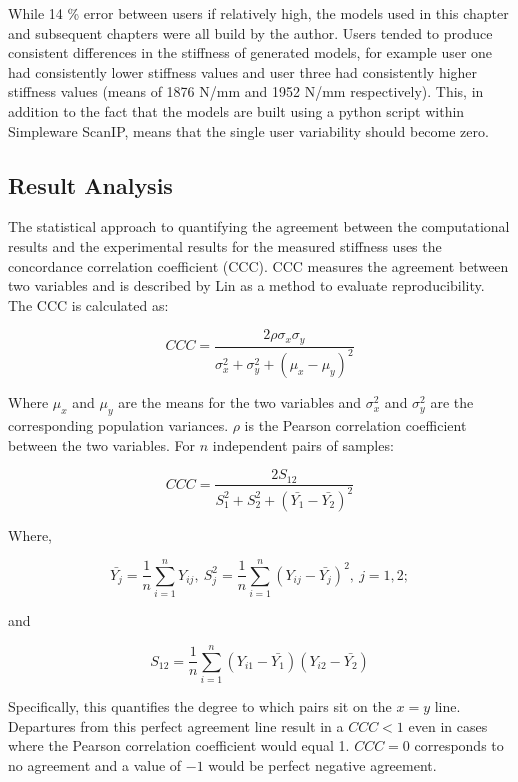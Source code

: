 While 14 \% error between users if relatively high, the models used in this
chapter and subsequent chapters were all build by the author. Users tended to
produce consistent differences in the stiffness of generated models, for
example user one had consistently lower stiffness values and user three had
consistently higher stiffness values (means of 1876 N/mm and 1952 N/mm
respectively). This, in addition to the fact that the models are built using a
python script within Simpleware ScanIP, means that the single user variability
should become zero.

\subsection{Result Analysis}

The statistical approach to quantifying the agreement between the computational
results and the experimental results for the measured stiffness uses the
concordance correlation coefficient (CCC).  CCC measures the agreement between
two variables and is described by Lin \cite{lawrence1989concordance} as a
method to evaluate reproducibility.  The CCC is calculated as:

\begin{equation*} CCC = \dfrac{2 \rho \sigma_x \sigma_y}{\sigma_x^2 +
\sigma_y^2 + (\mu_x - \mu_y)^2} 
\end{equation*} 

Where $\mu_x$ and $\mu_y$ are the means for the two variables and $\sigma_x^2$
and $\sigma_y^2$ are the corresponding population variances.  $\rho$ is the
Pearson correlation coefficient between the two variables.  For $n$ independent
pairs of samples:

\begin{equation*} CCC = \dfrac{2S_{12}}{S_1^2 + S_2^2 +
(\bar{Y_1}-\bar{Y_2})^2} 
\end{equation*}

Where, 

\begin{equation*} \bar{Y_j} =
\dfrac{1}{n} \sum_{i=1}^{n} Y_{ij},\ S_j^2 = \dfrac{1}{n} \sum_{i=1}^{n}
(Y_{ij} - \bar{Y_j})^2,\ j = 1, 2; 
\end{equation*}

and

\begin{equation*} S_{12}
    = \dfrac{1}{n} \sum_{i=1}^{n} (Y_{i1} - \bar{Y_1})(Y_{i2} - \bar{Y_2})
\end{equation*}

Specifically, this quantifies the degree to which pairs sit on the $x=y$ line.
Departures from this perfect agreement line result in a $CCC < 1$ even in cases
where the Pearson correlation coefficient would equal 1.  $CCC = 0$ corresponds
to no agreement and a value of $-1$ would be perfect negative agreement.



